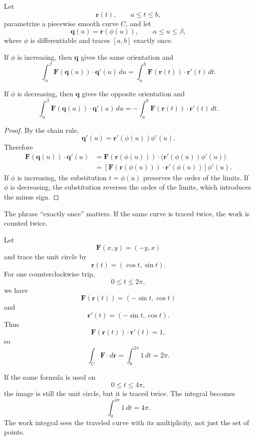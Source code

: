 \begin{theorem}
Let
\[
    \mathbf r(t),\qquad a\le t\le b,
\]
parametrize a piecewise smooth curve \(C\), and let
\[
    \mathbf q(u)=\mathbf r(\phi(u)),
    \qquad
    \alpha\le u\le\beta,
\]
where \(\phi\) is differentiable and traces \([a,b]\) exactly once.

If \(\phi\) is increasing, then \(\mathbf q\) gives the same orientation and
\[
\boxed{
    \int_\alpha^\beta
    \mathbf F(\mathbf q(u))\cdot\mathbf q'(u)\,du
    =
    \int_a^b
    \mathbf F(\mathbf r(t))\cdot\mathbf r'(t)\,dt.
}
\]

If \(\phi\) is decreasing, then \(\mathbf q\) gives the opposite orientation and
\[
\boxed{
    \int_\alpha^\beta
    \mathbf F(\mathbf q(u))\cdot\mathbf q'(u)\,du
    =
    -
    \int_a^b
    \mathbf F(\mathbf r(t))\cdot\mathbf r'(t)\,dt.
}
\]
\end{theorem}

\begin{proof}
By the chain rule,
\[
    \mathbf q'(u)=\mathbf r'(\phi(u))\phi'(u).
\]
Therefore
\[
\begin{aligned}
\mathbf F(\mathbf q(u))\cdot\mathbf q'(u)
&=
\mathbf F(\mathbf r(\phi(u)))\cdot
\bigl(\mathbf r'(\phi(u))\phi'(u)\bigr)\\
&=
\left[
\mathbf F(\mathbf r(\phi(u)))\cdot
\mathbf r'(\phi(u))
\right]\phi'(u).
\end{aligned}
\]
If \(\phi\) is increasing, the substitution \(t=\phi(u)\) preserves the order of the
limits.  If \(\phi\) is decreasing, the substitution reverses the order of the limits, which
introduces the minus sign.
\end{proof}

The phrase ``exactly once'' matters.  If the same curve is traced twice, the work is
counted twice.

\begin{example}
Let
\[
    \mathbf F(x,y)=(-y,x)
\]
and trace the unit circle by
\[
    \mathbf r(t)=(\cos t,\sin t).
\]
For one counterclockwise trip,
\[
    0\le t\le2\pi,
\]
we have
\[
    \mathbf F(\mathbf r(t))=(-\sin t,\cos t)
\]
and
\[
    \mathbf r'(t)=(-\sin t,\cos t).
\]
Thus
\[
    \mathbf F(\mathbf r(t))\cdot\mathbf r'(t)=1,
\]
so
\[
    \int_C \mathbf F\cdot d\mathbf r
    =
    \int_0^{2\pi}1\,dt
    =
    2\pi.
\]

If the same formula is used on
\[
    0\le t\le4\pi,
\]
the image is still the unit circle, but it is traced twice.  The integral becomes
\[
    \int_0^{4\pi}1\,dt=4\pi.
\]
The work integral sees the traveled curve with its multiplicity, not just the set of
points.
\end{example}

